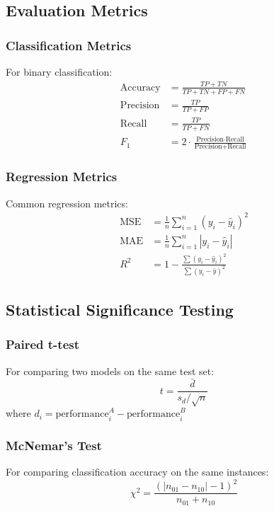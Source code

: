 \documentclass{article}
\begin{document}
\subsection{Evaluation Metrics}

\subsubsection{Classification Metrics}

For binary classification:
\begin{align*}
\text{Accuracy} &= \frac{TP + TN}{TP + TN + FP + FN} \\
\text{Precision} &= \frac{TP}{TP + FP} \\
\text{Recall} &= \frac{TP}{TP + FN} \\
F_1 &= 2 \cdot \frac{\text{Precision} \cdot \text{Recall}}{\text{Precision} + \text{Recall}}
\end{align*}

\subsubsection{Regression Metrics}

Common regression metrics:
\begin{align*}
\text{MSE} &= \frac{1}{n} \sum_{i=1}^n (y_i - \hat{y}_i)^2 \\
\text{MAE} &= \frac{1}{n} \sum_{i=1}^n |y_i - \hat{y}_i| \\
R^2 &= 1 - \frac{\sum (y_i - \hat{y}_i)^2}{\sum (y_i - \bar{y})^2}
\end{align*}

\subsection{Statistical Significance Testing}

\subsubsection{Paired t-test}

For comparing two models on the same test set:
\[
t = \frac{\bar{d}}{s_d / \sqrt{n}}
\]
where $d_i = \text{performance}_i^A - \text{performance}_i^B$

\subsubsection{McNemar's Test}

For comparing classification accuracy on the same instances:
\[
\chi^2 = \frac{(|n_{01} - n_{10}| - 1)^2}{n_{01} + n_{10}}
\]
\end{document}
